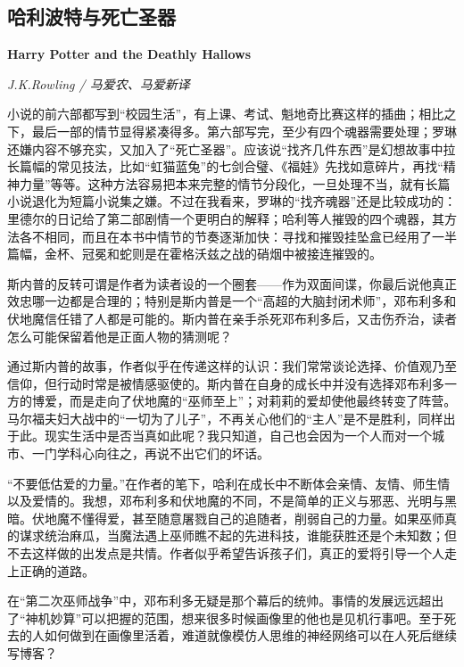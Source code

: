 \subsection*{哈利波特与死亡圣器}
\par \textbf{Harry Potter and the Deathly Hallows}
\par \emph{J.K.Rowling / 马爱农、马爱新译} 
\par 小说的前六部都写到“校园生活”，有上课、考试、魁地奇比赛这样的插曲；相比之下，最后一部的情节显得紧凑得多。第六部写完，至少有四个魂器需要处理；罗琳还嫌内容不够充实，又加入了“死亡圣器”。应该说“找齐几件东西”是幻想故事中拉长篇幅的常见技法，比如“虹猫蓝兔”的七剑合璧、《福娃》先找如意碎片，再找“精神力量”等等。这种方法容易把本来完整的情节分段化，一旦处理不当，就有长篇小说退化为短篇小说集之嫌。不过在我看来，罗琳的“找齐魂器”还是比较成功的：里德尔的日记给了第二部剧情一个更明白的解释；哈利等人摧毁的四个魂器，其方法各不相同，而且在本书中情节的节奏逐渐加快：寻找和摧毁挂坠盒已经用了一半篇幅，金杯、冠冕和蛇则是在霍格沃兹之战的硝烟中被接连摧毁的。
\par 斯内普的反转可谓是作者为读者设的一个圈套——作为双面间谍，你最后说他真正效忠哪一边都是合理的；特别是斯内普是一个“高超的大脑封闭术师”，邓布利多和伏地魔信任错了人都是可能的。斯内普在亲手杀死邓布利多后，又击伤乔治，读者怎么可能保留着他是正面人物的猜测呢？
\par 通过斯内普的故事，作者似乎在传递这样的认识：我们常常谈论选择、价值观乃至信仰，但行动时常是被情感驱使的。斯内普在自身的成长中并没有选择邓布利多一方的博爱，而是走向了伏地魔的“巫师至上”；对莉莉的爱却使他最终转变了阵营。马尔福夫妇大战中的“一切为了儿子”，不再关心他们的“主人”是不是胜利，同样出于此。现实生活中是否当真如此呢？我只知道，自己也会因为一个人而对一个城市、一门学科心向往之，再说不出它们的坏话。
\par “不要低估爱的力量。”在作者的笔下，哈利在成长中不断体会亲情、友情、师生情以及爱情的。我想，邓布利多和伏地魔的不同，不是简单的正义与邪恶、光明与黑暗。伏地魔不懂得爱，甚至随意屠戮自己的追随者，削弱自己的力量。如果巫师真的谋求统治麻瓜，当魔法遇上巫师瞧不起的先进科技，谁能获胜还是个未知数；但不去这样做的出发点是共情。作者似乎希望告诉孩子们，真正的爱将引导一个人走上正确的道路。
\par 在“第二次巫师战争”中，邓布利多无疑是那个幕后的统帅。事情的发展远远超出了“神机妙算”可以把握的范围，想来很多时候画像里的他也是见机行事吧。至于死去的人如何做到在画像里活着，难道就像模仿人思维的神经网络可以在人死后继续写博客？
\par {}


